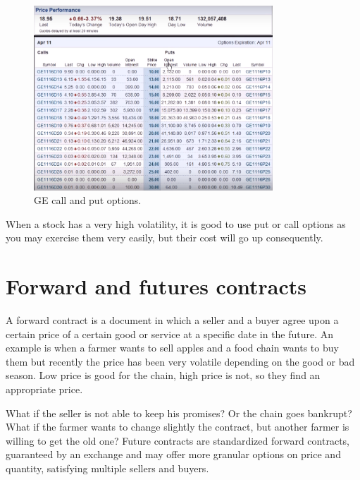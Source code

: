 \begin{figure}[h!]
\centering
\includegraphics[width=0.8\textwidth]{images/GE_options.png}
\caption{GE call and put options.}
\label{fig:GEoptions}
\end{figure}

When a stock has a very high volatility, it is good to use put or call options as you may exercise them very easily, but their cost will go up consequently.

\section{Forward and futures contracts}
A forward contract is a document in which a seller and a buyer agree upon a certain price of a certain good or service at a specific date in the future. An example is when a farmer wants to sell apples and a food chain wants to buy them but recently the price has been very volatile depending on the good or bad season. Low price is good for the chain, high price is not, so they find an appropriate price.

What if the seller is not able to keep his promises? Or the chain goes bankrupt? What if the farmer wants to change slightly the contract, but another farmer is willing to get the old one? Future contracts are standardized forward contracts, guaranteed by an exchange and may offer more granular options on price and quantity, satisfying multiple sellers and buyers. 

